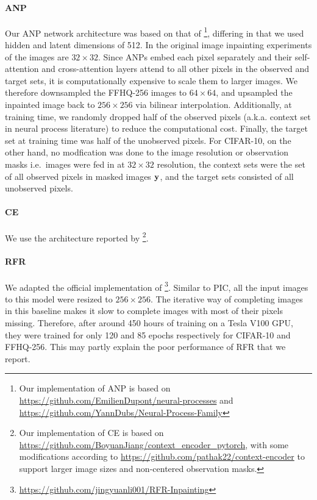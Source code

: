 \paragraph{ANP} Our ANP network architecture was based on that of
\citet{kim2019attentive}\footnote{Our implementation of ANP is based on
  \url{https://github.com/EmilienDupont/neural-processes} and
  \url{https://github.com/YannDubs/Neural-Process-Family}}, differing in that we
used hidden and latent dimensions of 512. In the original image inpainting
experiments of \citep{kim2019attentive} the images are $32 \times 32$. Since
ANPs embed each pixel separately and their self-attention and cross-attention
layers attend to all other pixels in the observed and target sets, it is
computationally expensive to scale them to larger images. We therefore
downsampled the FFHQ-256 images to $64 \times 64$, and upsampled the inpainted
image back to $256 \times 256$ via bilinear interpolation. Additionally, at
training time, we randomly dropped half of the observed pixels (a.k.a. context
set in neural process literature) to reduce the computational cost. Finally, the
target set at training time was half of the unobserved pixels. For CIFAR-10, on
the other hand, no modfication was done to the image resolution or observation
masks i.e.~images were fed in at $32 \times 32$ resolution, the context sets
were the set of all observed pixels in masked images $\mathbf{y}$, and the target
sets consisted of all unobserved pixels.

\paragraph{CE} We use the architecture reported by
\citet{pathak2016context}\footnote{Our implementation of CE is based on
  \url{https://github.com/BoyuanJiang/context_encoder_pytorch}, with some
  modifications according to \url{https://github.com/pathak22/context-encoder}
  to support larger image sizes and non-centered observation masks.}.

\paragraph{RFR} We adapted the official implementation of
\citet{li2020recurrent}\footnote{\url{https://github.com/jingyuanli001/RFR-Inpainting}}.
Similar to PIC, all the input images to this model were resized to
$256 \times 256$. The iterative way of completing images in this baseline makes
it slow to complete images with most of their pixels missing. Therefore, after
around 450 hours of training on a Tesla V100 GPU, they were trained for only 120
and 85 epochs respectively for CIFAR-10 and FFHQ-256. This may partly explain
the poor performance of RFR that we report.

